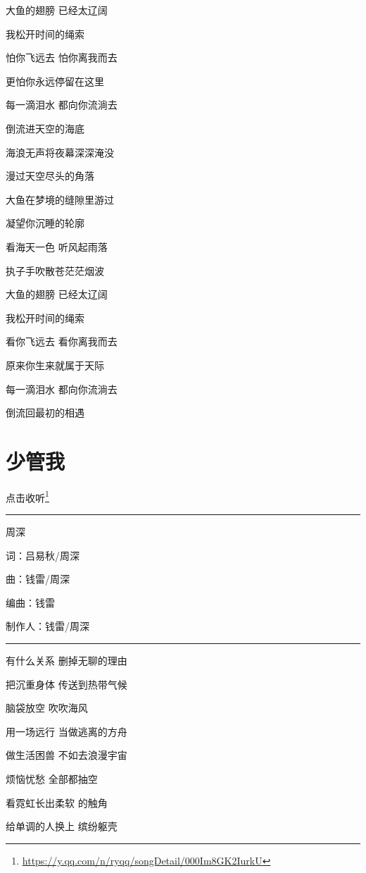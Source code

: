 \documentclass[]{ctexbook}
\renewcommand{\href}[2]{#2\footnote{\url{#1}}}
\begin{document}
大鱼的翅膀 已经太辽阔

我松开时间的绳索

怕你飞远去 怕你离我而去

更怕你永远停留在这里

每一滴泪水 都向你流淌去

倒流进天空的海底

海浪无声将夜幕深深淹没

漫过天空尽头的角落

大鱼在梦境的缝隙里游过

凝望你沉睡的轮廓

看海天一色 听风起雨落

执子手吹散苍茫茫烟波

大鱼的翅膀 已经太辽阔

我松开时间的绳索

看你飞远去 看你离我而去

原来你生来就属于天际

每一滴泪水 都向你流淌去

倒流回最初的相遇

\section*{少管我}\label{watch-ur-manners}


\href{https://y.qq.com/n/ryqq/songDetail/000Im8GK2IurkU}{点击收听}

\begin{center}\rule{0.5\linewidth}{0.5pt}\end{center}

周深

词：吕易秋/周深

曲：钱雷/周深

编曲：钱雷

制作人：钱雷/周深

\begin{center}\rule{0.5\linewidth}{0.5pt}\end{center}

有什么关系 删掉无聊的理由

把沉重身体 传送到热带气候

脑袋放空 吹吹海风

用一场远行 当做逃离的方舟

做生活困兽 不如去浪漫宇宙

烦恼忧愁 全部都抽空

看霓虹长出柔软 的触角

给单调的人换上 缤纷躯壳
\end{document}
